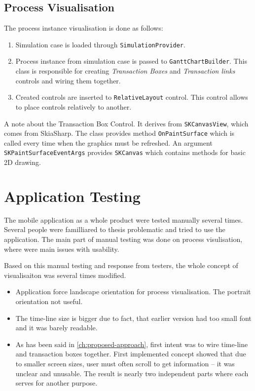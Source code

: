\subsection{Process Visualisation}
The process instance visualisation is done as follows:
\begin{enumerate}
\item Simulation case is loaded through \texttt{SimulationProvider}.
\item Process instance from simulation case is passed to \texttt{GanttChartBuilder}. This class is responsible for creating \textit{Transaction Boxes} and \textit{Transaction links} controls and wiring them together.
\item Created controls are inserted to \texttt{RelativeLayout} control. This control allows to place controls relatively to another. 
\end{enumerate}

A note about the Transaction Box Control. It derives from \texttt{SKCanvasView}, which comes from SkiaSharp. The class provides method \texttt{OnPaintSurface} which is called every time when the graphics must be refreshed. An argument \texttt{SKPaintSurfaceEventArgs} provides \texttt{SKCanvas} which contains methods for basic 2D drawing. 
\section{Application Testing}
The mobile application as a whole product were tested manually several times. Several people were familliared to  thesis problematic and tried to use the application. The main part of manual testing was done on process visulisation, where were main issues with usability. 

Based on this manual testing and response from testers, the whole concept of visualisaiton was several times modified. 
\begin{itemize}
\item Application force landscape orientation for process visualisation. The portrait orientation not useful.
\item The time-line size is bigger due to fact, that earlier version had too small font and it was barely readable.
\item As has been said in \cref{ch:proposed-approach}, first intent was to wire time-line and transaction boxes together. First implemented concept showed that due to smaller screen sizes, user must often scroll to get information -- it was unclear and unusable. The result is nearly two independent parts where each serves for another purpose. 
\end{itemize}
